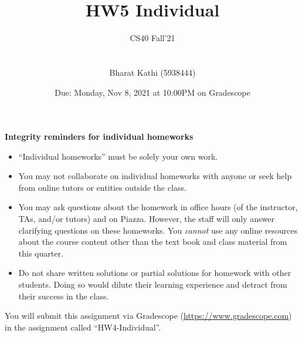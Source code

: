 \documentclass[12pt, oneside]{article}
\title{HW5 Individual}
\author{CS40 Fall'21\\\\\\
Bharat Kathi (5938444)}
\date{Due: Monday, Nov 8, 2021 at 10:00PM on Gradescope}
\begin{document}
\maketitle

{\bf Integrity reminders for individual homeworks}
\begin{itemize}
\item ``Individual homeworks'' must be solely your own work. 
\item You may not collaborate on individual homeworks with anyone or seek help from online tutors or entities outside the class.
\item You may ask questions about the homework in office hours (of the instructor, TAs, and/or tutors) and 
on Piazza.  However, the staff will only answer clarifying questions on these homeworks. You \emph{cannot} use any online resources about the course content other than the text
book and class material from this quarter.
\item Do not share written solutions or partial solutions for homework with other students. Doing so would dilute their learning experience and detract from their success in the class.
\end{itemize}

You will submit this assignment via Gradescope
(\href{https://www.gradescope.com}{https://www.gradescope.com}) in the assignment called ``HW4-Individual''.

\newpage
\end{document}
